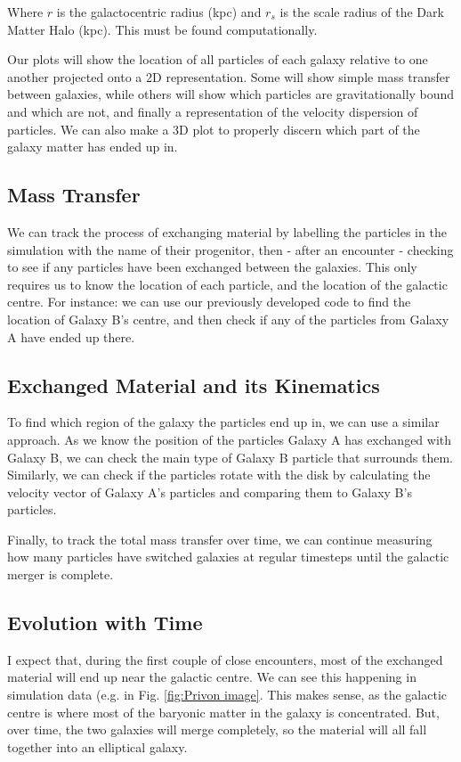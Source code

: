 \documentclass[linenumbers]{aastex631} %
\begin{document}
Where $r$ is the galactocentric radius (kpc) and $r_s$ is the scale radius of the Dark Matter Halo (kpc). This must be found computationally.

Our plots will show the location of all particles of each galaxy relative to one another projected onto a 2D representation. Some will show simple mass transfer between galaxies, while others will show which particles are gravitationally bound and which are not, and finally a representation of the velocity dispersion of particles. We can also make a 3D plot to properly discern which part of the galaxy matter has ended up in.

\subsection{Mass Transfer}

We can track the process of exchanging material by labelling the particles in the simulation with the name of their progenitor, then - after an encounter - checking to see if any particles have been exchanged between the galaxies. This only requires us to know the location of each particle, and the location of the galactic centre. For instance: we can use our previously developed code to find the location of Galaxy B's centre, and then check if any of the particles from Galaxy A have ended up there.

\subsection{Exchanged Material and its Kinematics}

To find which region of the galaxy the particles end up in, we can use a similar approach. As we know the position of the particles Galaxy A has exchanged with Galaxy B, we can check the main type of Galaxy B particle that surrounds them. Similarly, we can check if the particles rotate with the disk by calculating the velocity vector of Galaxy A's particles and comparing them to Galaxy B's particles. 

Finally, to track the total mass transfer over time, we can continue measuring how many particles have switched galaxies at regular timesteps until the galactic merger is complete.

\subsection{Evolution with Time}

I expect that, during the first couple of close encounters, most of the exchanged material will end up near the galactic centre. We can see this happening in simulation data (e.g. in Fig. \ref{fig:Privon image}. This makes sense, as the galactic centre is where most of the baryonic matter in the galaxy is concentrated. But, over time, the two galaxies will merge completely, so the material will all fall together into an elliptical galaxy.
\end{document}
